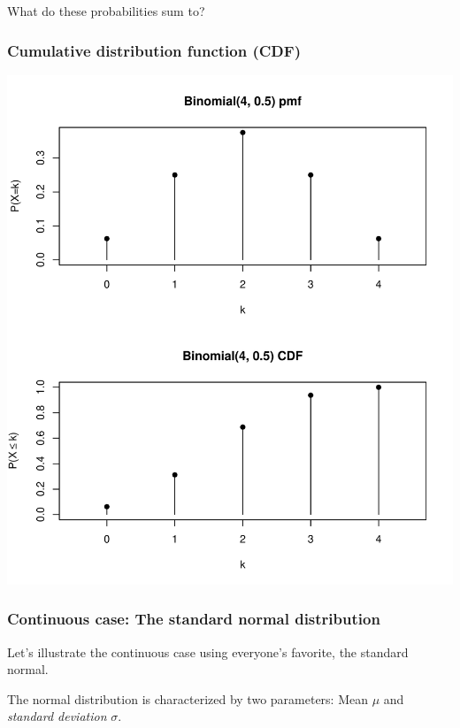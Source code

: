 \documentclass[
  11pt,
]{article}
\begin{document}
What do these probabilities sum to?

\hypertarget{cumulative-distribution-function-cdf}{%
\subsubsection{Cumulative distribution function (CDF)}\label{cumulative-distribution-function-cdf}}

\begin{center}\includegraphics{01-01-lec_files/figure-latex/binom-2-1} \end{center}

\hypertarget{continuous-case-the-standard-normal-distribution}{%
\subsubsection{Continuous case: The standard normal distribution}\label{continuous-case-the-standard-normal-distribution}}

Let's illustrate the continuous case using everyone's favorite, the standard normal.

The normal distribution is characterized by two parameters: Mean \(\mu\) and \emph{standard deviation} \(\sigma\).
\end{document}
